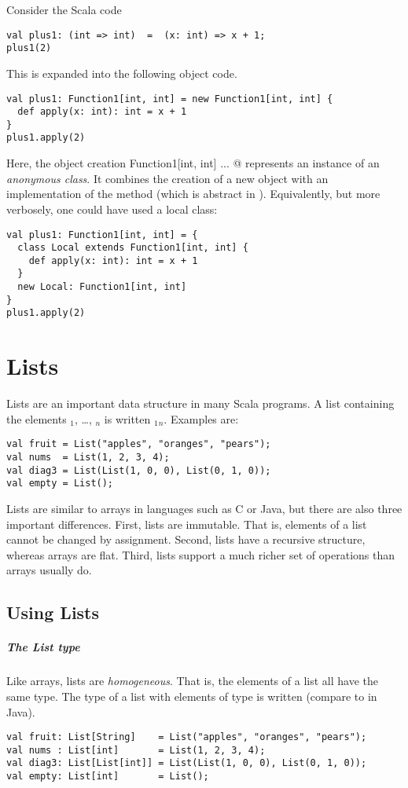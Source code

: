 \documentclass[a4paper,12pt,twoside,titlepage]{book}
\begin{document}
\example Consider the Scala code
\begin{lstlisting}
val plus1: (int => int)  =  (x: int) => x + 1;
plus1(2)
\end{lstlisting}
This is expanded into the following object code.
\begin{lstlisting}
val plus1: Function1[int, int] = new Function1[int, int] {
  def apply(x: int): int = x + 1
}
plus1.apply(2)
\end{lstlisting}
Here, the object creation \lstinline@new Function1[int, int]{ ... }@
represents an instance of an {\em anonymous class}. It combines the
creation of a new  object with an implementation of 
the  method (which is abstract in ).
Equivalently, but more verbosely, one could have used a local class:
\begin{lstlisting}
val plus1: Function1[int, int] = {
  class Local extends Function1[int, int] {
    def apply(x: int): int = x + 1
  }
  new Local: Function1[int, int]
}
plus1.apply(2)
\end{lstlisting}
 
\chapter{Lists}

Lists are an important data structure in many Scala programs.  
A list containing the elements $_1$, \ldots, $_n$ is written
$_1$$_n$\code{)}. Examples are:
\begin{lstlisting}
val fruit = List("apples", "oranges", "pears");
val nums  = List(1, 2, 3, 4);
val diag3 = List(List(1, 0, 0), List(0, 1, 0));
val empty = List();
\end{lstlisting}
Lists are similar to arrays in languages such as C or Java, but there
are also three important differences. First, lists are immutable. That
is, elements of a list cannot be changed by assignment. Second, 
lists have a recursive structure, whereas arrays are flat. Third,
lists support a much richer set of operations than arrays usually do.

\section{Using Lists}

\paragraph{The List type}
Like arrays, lists are {\em homogeneous}. That is, the elements of a
list all have the same type.  The type of a list with elements of type
 is written  (compare to  in Java).
\begin{lstlisting}
val fruit: List[String]    = List("apples", "oranges", "pears");
val nums : List[int]       = List(1, 2, 3, 4);
val diag3: List[List[int]] = List(List(1, 0, 0), List(0, 1, 0));
val empty: List[int]       = List();
\end{lstlisting}
\end{document}
